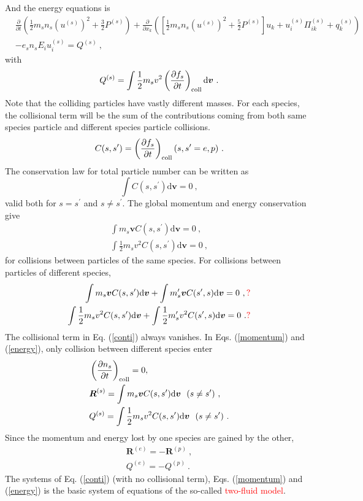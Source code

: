 \documentclass[12pt,a4paper]{article}
\renewcommand{\vec}[1]{\boldsymbol{#1}}
\newcommand{\dif}{\mathrm{d}}
\begin{document}
And  the energy equations is
\begin{align}
\nonumber & \frac{\partial}{\partial t}\left(\frac{1}{2} m_s n_s (u^{(s)})^2 +\frac{3}{2} P^{(s)} \right) +\frac{\partial}{\partial x_k}\left(\left[ \frac{1}{2} m_s n_s (u^{(s)})^2 +\frac{5}{2} P^{(s)} \right]u_k +u_i^{(s)} \Pi_{ik}^{(s)} +q_k^{(s)}\right) \\
& -e_s n_s E_i u_i^{(s)} = Q^{(s)} ~,
\label{energy}
\end{align}
with
\begin{equation*}
Q^{(s)} = \int \frac{1}{2} m_s v^2 \left(\frac{\partial f_s}{\partial t} \right)_{\rm coll} \dif \vec{v} ~.
\end{equation*}
Note that the colliding particles have vastly different masses. For each species, the collisional term will be the sum of the contributions coming from both same species particle and different species particle collisions. 
\begin{equation*}
C(s, s^\prime) = \left(\frac{\partial f_s}{\partial t} \right)_{\rm coll} (s, s^\prime = e, p) ~.
\end{equation*}
The conservation law for total particle number can be written as
\begin{equation}
\int C(s, s^\prime) \dif \vec{v} = 0 ~,
\end{equation}
valid both for $s = s^\prime $ and $s \neq  s^\prime$. The global momentum and energy conservation give
\begin{align*}
\int m_s \vec{v} C(s, s^\prime) \dif \vec{v} = 0 ~,\\
\int \frac{1}{2}m_s v^2 C(s, s^\prime) \dif \vec{v} = 0 ~,
\end{align*}
for collisions between particles of the same species. For collisions between particles of different species, 
\begin{align*}
\int m_s \vec{v} C(s, s^\prime) \dif \vec{v} +\int m^\prime_s \vec{v} C(s^\prime, s) \dif \vec{v}  = 0 ~, \color{red}{?}\\
\int \frac{1}{2}m_s v^2 C(s, s^\prime) \dif \vec{v} +\int \frac{1}{2}m^\prime_s v^2 C(s^\prime, s) \dif \vec{v} = 0 ~. \color{red}{?}
\end{align*}
The collisional term in Eq. (\ref{conti}) always vanishes. In Eqs. (\ref{momentum}) and (\ref{energy}), only collision between different species enter
\begin{align*}
& \left(\frac{\partial n_s}{\partial t} \right)_{\rm coll} = 0, \\
& \vec{R}^{(s)} = \int m_s \vec{v} C(s, s^\prime) \dif \vec{v}  ~~ (s \neq  s^\prime) ~, \\
& Q^{(s)} = \int \frac{1}{2} m_s v^2 C(s, s^\prime) \dif \vec{v} ~~ (s \neq  s^\prime) ~.
\end{align*}
Since the momentum and energy lost by one species are gained by the other, 
\begin{align}
\vec{R}^{(e)} = -\vec{R}^{(p)} ~, \\
Q^{(e)} = -Q^{(p)} ~.
\end{align}
The systems of Eq. (\ref{conti}) (with no collisional term), Eqs. (\ref{momentum}) and (\ref{energy}) is the basic system of equations of the so-called \textcolor{red}{two-fluid model}. 
\end{document}
